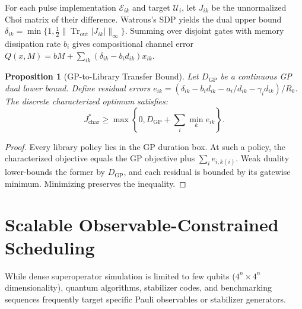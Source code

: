 \documentclass[10pt,letterpaper,journal]{IEEEtran}
\newtheorem{proposition}{Proposition}
\begin{document}
For each pulse implementation $\mathcal{E}_{ik}$ and target $\mathcal{U}_i$, let $J_{ik}$ be the unnormalized Choi matrix of their difference. Watrous's SDP \cite{watrous} yields the dual upper bound $\delta_{ik} = \min\{ 1, \tfrac{1}{2}\|\operatorname{Tr}_{\mathrm{out}} |J_{ik}| \|_\infty\}$. Summing over disjoint gates with memory dissipation rate $b_i$ gives compositional channel error $Q(x, M) = bM + \sum_{ik} (\delta_{ik} - b_i d_{ik})x_{ik}$.

\begin{proposition}[GP-to-Library Transfer Bound]\label{prop:transfer}
Let $D_{\mathrm{GP}}$ be a continuous GP dual lower bound. Define residual errors $e_{ik} = (\delta_{ik} - b_i d_{ik} - a_i/d_{ik} - \gamma_i d_{ik})/R_0$. The discrete characterized optimum satisfies:
\begin{equation}
J_{\mathrm{char}}^* \ge \max\left\{ 0, D_{\mathrm{GP}} + \sum_i \min_k e_{ik} \right\}.
\end{equation}
\end{proposition}
\begin{proof}
Every library policy lies in the GP duration box. At such a policy, the characterized objective equals the GP objective plus $\sum_i e_{i, k(i)}$. Weak duality lower-bounds the former by $D_{\mathrm{GP}}$, and each residual is bounded by its gatewise minimum. Minimizing preserves the inequality.
\end{proof}

\section{Scalable Observable-Constrained Scheduling}
While dense superoperator simulation is limited to few qubits ($4^n \times 4^n$ dimensionality), quantum algorithms, stabilizer codes, and benchmarking sequences frequently target specific Pauli observables or stabilizer generators.
\end{document}
